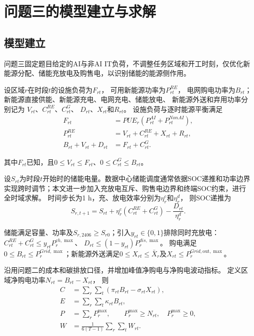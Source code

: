 \section{问题三的模型建立与求解}

\subsection{模型建立}

问题三固定题目给定的AI与非AI IT负荷，不调整任务区域和开工时刻，仅优化新能源分配、储能充放电及购售电，以识别储能的能源侧作用。

设区域$r$在时段$t$的设施负荷为$F_{rt}$，
可用新能源功率为$P^{RE}_{rt}$，
电网购电功率为$B_{rt}$；
新能源直接供能、新能源充电、电网充电、储能放电、
新能源外送和弃用功率分别记为
$V_{rt}$、$C^{RE}_{rt}$、$C^G_{rt}$、
$D_{rt}$、$X_{rt}$和$R_{rt}$。
设施负荷与逐时能源平衡满足
\begin{equation}
	\begin{aligned}
		F_{rt}
		&=
		PUE_r
		\left(
		P^{AI}_{rt}+P^{NonAI}_{rt}
		\right),\\
		P^{RE}_{rt}
		&=
		V_{rt}+C^{RE}_{rt}+X_{rt}+R_{rt},\\
		B_{rt}+V_{rt}+D_{rt}
		&=
		F_{rt}+C^G_{rt}.
	\end{aligned}
	\label{eq:q3_energy_balance}
\end{equation}

其中$F_{rt}$已知，且$0\leq V_{rt}\leq F_{rt}$、$0\leq C^G_{rt}\leq B_{rt}$。

设$S_{rt}$为时段$t$开始时的储能电量。数据中心储能调度通常依据SOC递推和功率边界实现跨时调节\cite{ref10}；本文进一步加入充放电互斥、购售电边界和终端SOC约束，进行全时域求解。
时间步长为1 h，充、放电效率分别为$\eta_r^c$和$\eta_r^d$，
则SOC递推为
\begin{equation}
	S_{r,t+1}
	=
	S_{rt}
	+
	\eta_r^c
	\left(
	C^{RE}_{rt}+C^G_{rt}
	\right)
	-
	\frac{D_{rt}}{\eta_r^d}.
	\label{eq:q3_soc}
\end{equation}

储能满足容量、功率及$S_{r,2406}\geq S_{r0}$；引入$y_{rt}\in\{0,1\}$排除同时充放电：
$C^{RE}_{rt}+C^G_{rt}\leq y_{rt}P_r^{ch,\max}$、
$D_{rt}\leq(1-y_{rt})P_r^{dis,\max}$。
购电满足$0\leq B_{rt}\leq P_r^{Grid,\max}$；新能源外送满足$0\leq X_{rt}\leq\bar X_r$及$X_{rt}\leq P_r^{Grid,\mathrm{out},\max}$。

沿用问题二的成本和碳排放口径，并增加峰值净购电与净购电波动指标。
定义区域净购电功率$N_{rt}=B_{rt}-X_{rt}$，
则
\begin{equation}
	\begin{aligned}
		C&=
		\sum_r\sum_t
		\left(
		\pi_{rt}B_{rt}-\sigma_{rt}X_{rt}
		\right),\\
		E&=
		\sum_r\sum_t
		\kappa_{rt}B_{rt},\\
		P&=
		\sum_rP_r^{\max},
		\qquad
		P_r^{\max}\geq N_{rt},\quad
		P_r^{\max}\geq0,\\
		W&=
		\frac{1}{6(T-1)}
		\sum_r\sum_tW_{rt}.
	\end{aligned}
	\label{eq:q3_objectives}
\end{equation}


